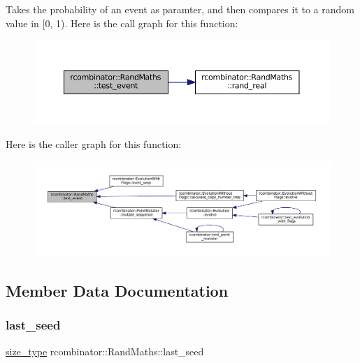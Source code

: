 Takes the probability of an event as paramter, and then compares it to a random value in \mbox{[}0, 1). Here is the call graph for this function\+:
\nopagebreak
\begin{figure}[H]
\begin{center}
\leavevmode
\includegraphics[width=350pt]{classrcombinator_1_1RandMaths_a183686140a9da18ad40c7e048ee8914e_cgraph}
\end{center}
\end{figure}
Here is the caller graph for this function\+:
\nopagebreak
\begin{figure}[H]
\begin{center}
\leavevmode
\includegraphics[width=350pt]{classrcombinator_1_1RandMaths_a183686140a9da18ad40c7e048ee8914e_icgraph}
\end{center}
\end{figure}


\subsection{Member Data Documentation}
\mbox{\label{classrcombinator_1_1RandMaths_ad50c9491e051cf068d1d2f77b5e80e6f}} 
\subsubsection{\texorpdfstring{last\+\_\+seed}{last\_seed}}
{\footnotesize\ttfamily \mbox{\hyperlink{constants_8h_abcd18a5521fc90ff6e7b00e4fee98397}{size\+\_\+type}} rcombinator\+::\+Rand\+Maths\+::last\+\_\+seed\hspace{0.3cm}{\ttfamily [private]}}



